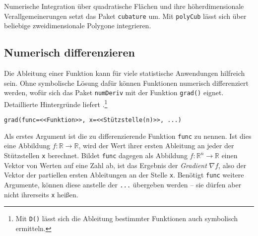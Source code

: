 Numerische Integration über quadratische Flächen und ihre höherdimensionale Verallgemeinerungen setzt das Paket \lstinline!cubature! \cite{Balasubramanian2013} um. Mit \lstinline!polyCub! \cite{Meyer2014} lässt sich über beliebige zweidimensionale Polygone integrieren.

\subsection{Numerisch differenzieren}
\label{sec:numDeriv}

Die Ableitung einer Funktion kann für viele statistische Anwendungen hilfreich sein. Ohne symbolische Lösung dafür können Funktionen numerisch differenziert werden, wofür sich das Paket \lstinline!numDeriv! \cite{Gilbert2015} mit der Funktion \lstinline!grad()! eignet. Detaillierte Hintergründe liefert .\footnote{Mit \lstinline!D()! lässt sich die Ableitung bestimmter Funktionen auch symbolisch ermitteln.}
\begin{lstlisting}
grad(func=<<Funktion>>, x=<<Stützstelle(n)>>, ...)
\end{lstlisting}

Als erstes Argument ist die zu differenzierende Funktion \lstinline!func! zu nennen. Ist dies eine Abbildung $f: \mathbb{R} \rightarrow \mathbb{R}$, wird der Wert ihrer ersten Ableitung an jeder der Stützstellen \lstinline!x! berechnet. Bildet \lstinline!func! dagegen als Abbildung $f: \mathbb{R}^{n} \rightarrow \mathbb{R}$ einen Vektor von Werten auf eine Zahl ab, ist das Ergebnis der \emph{Gradient} $\nabla f$, also der Vektor der partiellen ersten Ableitungen an der Stelle \lstinline!x!. Benötigt \lstinline!func! weitere Argumente, können diese anstelle der \lstinline!...! übergeben werden -- sie dürfen aber nicht ihrerseits \lstinline!x! heißen.

